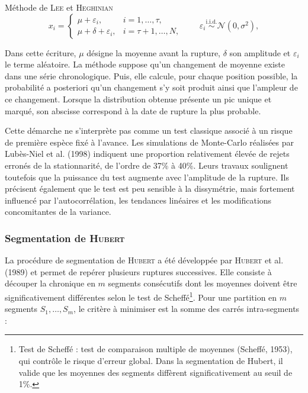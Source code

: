\documentclass[12pt,a4paper]{report}
\begin{document}
\begin{formulabox}[0.90\linewidth]{Méthode de \textsc{Lee} et \textsc{Heghinian}}
\begin{equation}
x_i=
\begin{cases}
\mu+\varepsilon_i,
  & i=1,\ldots,\tau,\\[1mm]
\mu+\delta+\varepsilon_i,
  & i=\tau+1,\ldots,N,
\end{cases}
\qquad
\varepsilon_i\overset{\text{i.i.d.}}{\sim}\mathcal{N}(0,\sigma^2),
\label{eq:lee-heghinian}
\end{equation}
\end{formulabox}

Dans cette écriture, $\mu$ désigne la moyenne avant la rupture, $\delta$ son amplitude et $\varepsilon_i$ le terme aléatoire. La méthode suppose qu'un changement de moyenne existe dans une série chronologique. Puis, elle calcule, pour chaque position possible, la probabilité a posteriori qu'un changement s'y soit produit ainsi que l'ampleur de ce changement. Lorsque la distribution obtenue présente un pic unique et marqué, son abscisse correspond à la date de rupture la plus probable.

Cette démarche ne s'interprète pas comme un test classique associé à un risque de première espèce fixé à l'avance. Les simulations de Monte-Carlo réalisées par Lubès-Niel et al. (1998) indiquent une proportion relativement élevée de rejets erronés de la stationnarité, de l'ordre de 37\% à 40\%. Leurs travaux soulignent toutefois que la puissance du test augmente avec l'amplitude de la rupture. Ils précisent également que le test est peu sensible à la dissymétrie, mais fortement influencé par l'autocorrélation, les tendances linéaires et les modifications concomitantes de la variance.

\subsubsection{Segmentation de \textsc{Hubert}}

La procédure de segmentation de \textsc{Hubert} a été développée par \textsc{Hubert} et al. (1989) et permet de repérer plusieurs ruptures successives. Elle consiste à découper la chronique en $m$ segments consécutifs dont les moyennes doivent être significativement différentes selon le test de Scheffé\footnote{Test de Scheffé : test de comparaison multiple de moyennes (Scheffé, 1953), qui contrôle le risque d’erreur global. Dans la segmentation de Hubert, il valide que les moyennes des segments diffèrent significativement au seuil de 1\%.}. Pour une partition en $m$ segments $S_1,\ldots,S_m$, le critère à minimiser est la somme des carrés intra-segments :
\end{document}

